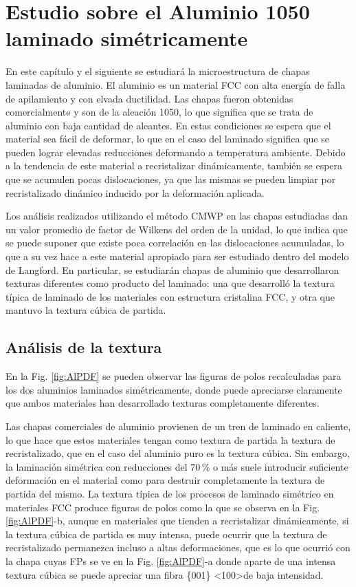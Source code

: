 \chapter{Estudio sobre el Aluminio 1050 laminado simétricamente}\label{C:AlS}
\graphicspath{{./figs/06_Al/}}

En este capítulo y el siguiente se estudiará la microestructura de chapas laminadas de aluminio.
El aluminio es un material FCC con alta energía de falla de apilamiento y con elvada ductilidad.
Las chapas fueron obtenidas comercialmente y son de la aleación 1050, lo que significa que se trata de aluminio con baja cantidad de aleantes.
En estas condiciones se espera que el material sea fácil de deformar, lo que en el caso del laminado significa que se pueden lograr elevadas reducciones deformando a temperatura ambiente.
Debido a la tendencia de este material a recristalizar dinámicamente, también se espera que se acumulen pocas dislocaciones, ya que las mismas se pueden limpiar por recristalizado dinámico inducido por la deformación aplicada.

Los análisis realizados utilizando el método CMWP en las chapas estudiadas dan un valor promedio de factor de Wilkens del orden de la unidad, lo que indica que se puede suponer que existe poca correlación en las dislocaciones acumuladas, lo que a su vez hace a este material apropiado para ser estudiado dentro del modelo de Langford.
En particular, se estudiarán chapas de aluminio que desarrollaron texturas diferentes como producto del laminado: una que desarrolló la textura típica de laminado de los materiales con estructura cristalina FCC, y otra que mantuvo la textura cúbica de partida.

\section{Análisis de la textura}\label{S:AlText}
En la Fig. \ref{fig:AlPDF} se pueden observar las figuras de polos recalculadas para los dos aluminios laminados simétricamente, donde puede apreciarse claramente que ambos materiales han desarrollado texturas completamente diferentes.

Las chapas comerciales de aluminio provienen de un tren de laminado en caliente, lo que hace que estos materiales tengan como textura de partida la textura de recristalizado, que en el caso del aluminio puro es la textura cúbica.
Sin embargo, la laminación simétrica con reducciones del 70\,\% o más suele introducir suficiente deformación en el material como para destruir completamente la textura de partida del mismo.
La textura típica de los procesos de laminado simétrico en materiales FCC produce figuras de polos como la que se observa en la Fig.\,\ref{fig:AlPDF}-b, aunque en materiales que tienden a recristalizar dinámicamente, si la textura cúbica de partida es muy intensa, puede ocurrir que la textura de recristalizado permanezca incluso a altas deformaciones, que es lo que ocurrió con la chapa cuyas FPs se ve en la Fig. \ref{fig:AlPDF}-a donde aparte de una intensa textura cúbica se puede apreciar una fibra \{001\} \textless 100\textgreater de baja intensidad.


